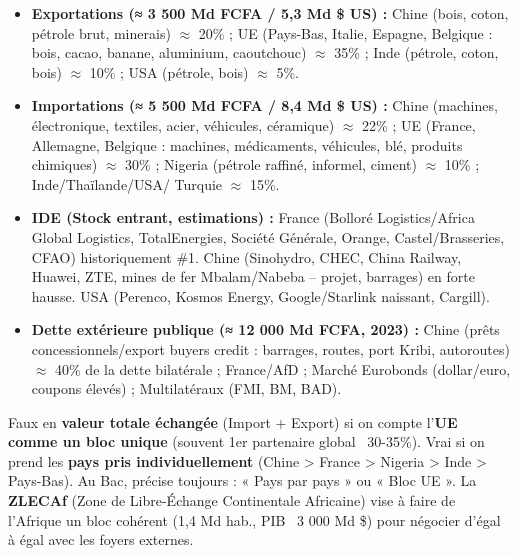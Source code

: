 \documentclass[11pt]{article}
\begin{document}
\begin{exemplebox}
\begin{itemize}
    \item \textbf{Exportations (≈ 3 500 Md FCFA / 5,3 Md \$ US) :} Chine (bois, coton, pétrole brut, minerais) $\approx$ 20\% ; UE (Pays-Bas, Italie, Espagne, Belgique : bois, cacao, banane, aluminium, caoutchouc) $\approx$ 35\% ; Inde (pétrole, coton, bois) $\approx$ 10\% ; USA (pétrole, bois) $\approx$ 5\%.
    \item \textbf{Importations (≈ 5 500 Md FCFA / 8,4 Md \$ US) :} Chine (machines, électronique, textiles, acier, véhicules, céramique) $\approx$ 22\% ; UE (France, Allemagne, Belgique : machines, médicaments, véhicules, blé, produits chimiques) $\approx$ 30\% ; Nigeria (pétrole raffiné, informel, ciment) $\approx$ 10\% ; Inde/Thaïlande/USA/ Turquie $\approx$ 15\%.
    \item \textbf{IDE (Stock entrant, estimations) :} France (Bolloré Logistics/Africa Global Logistics, TotalEnergies, Société Générale, Orange, Castel/Brasseries, CFAO) historiquement \#1. Chine (Sinohydro, CHEC, China Railway, Huawei, ZTE, mines de fer Mbalam/Nabeba -- projet, barrages) en forte hausse. USA (Perenco, Kosmos Energy, Google/Starlink naissant, Cargill).
    \item \textbf{Dette extérieure publique (≈ 12 000 Md FCFA, 2023) :} Chine (prêts concessionnels/export buyers credit : barrages, routes, port Kribi, autoroutes) $\approx$ 40\% de la dette bilatérale ; France/AfD ; Marché Eurobonds (dollar/euro, coupons élevés) ; Multilatéraux (FMI, BM, BAD).
\end{itemize}
\end{exemplebox}

\begin{attention}
Faux en \textbf{valeur totale échangée} (Import + Export) si on compte l'\textbf{UE comme un bloc unique} (souvent 1er partenaire global ~30-35\%). Vrai si on prend les \textbf{pays pris individuellement} (Chine > France > Nigeria > Inde > Pays-Bas). Au Bac, précise toujours : « Pays par pays » ou « Bloc UE ». La \textbf{ZLECAf} (Zone de Libre-Échange Continentale Africaine) vise à faire de l'Afrique un bloc cohérent (1,4 Md hab., PIB ~3 000 Md \$) pour négocier d'égal à égal avec les foyers externes.
\end{attention}
\end{document}
